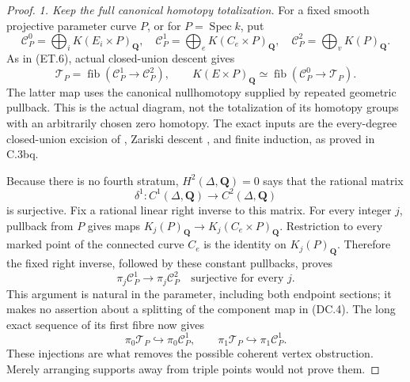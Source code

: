 \begin{proof}
\emph{1. Keep the full canonical homotopy totalization.}
For a fixed smooth projective parameter curve $P$, or for
$P=\operatorname{Spec}k$, put
\[
 \mathcal C_P^0=\bigoplus_iK(E_i\times P)_{\mathbf Q},\quad
 \mathcal C_P^1=\bigoplus_eK(C_e\times P)_{\mathbf Q},\quad
 \mathcal C_P^2=\bigoplus_vK(P)_{\mathbf Q}.
\]
As in (ET.6), actual closed-union descent gives
\begin{equation}
 \mathcal T_P=\operatorname{fib}(\mathcal C_P^1\to\mathcal C_P^2),
 \qquad
 K(E\times P)_{\mathbf Q}\simeq
                \operatorname{fib}(\mathcal C_P^0\to\mathcal T_P).
                                                               \tag{DC.4}
\end{equation}
The latter map uses the canonical nullhomotopy supplied by repeated
geometric pullback. This is the actual diagram, not the totalization
of its homotopy groups with an arbitrarily chosen zero homotopy.
The exact inputs are the every-degree closed-union excision of
\citet[Theorems A and C, printed pp.~29--30]
{rootGeisserHesselholt2011}, Zariski descent
\citep[Theorem 8.1 and proof, p.~367]{D_ThomasonTrobaugh1990},
and finite induction, as proved in C.3bq.

Because there is no fourth stratum, $H^2(\Delta,\mathbf Q)=0$ says
that the rational matrix
\[
             \delta^1:C^1(\Delta,\mathbf Q)
                              \longrightarrow C^2(\Delta,\mathbf Q)
\]
is surjective. Fix a rational linear right inverse to this matrix.
For every integer $j$, pullback from $P$ gives maps
$K_j(P)_{\mathbf Q}\to K_j(C_e\times P)_{\mathbf Q}$.
Restriction to every marked point of the connected curve $C_e$
is the identity on $K_j(P)_{\mathbf Q}$. Therefore the fixed right
inverse, followed by these constant pullbacks, proves
\begin{equation}
 \pi_j\mathcal C_P^1\longrightarrow\pi_j\mathcal C_P^2
          \quad\text{surjective for every }j.             \tag{DC.5}
\end{equation}
This argument is natural in the parameter, including both endpoint
sections; it makes no assertion about a splitting of the component
map in (DC.4). The long exact sequence of its first fibre now gives
\begin{equation}
 \pi_0\mathcal T_P\hookrightarrow\pi_0\mathcal C_P^1,
 \qquad
 \pi_1\mathcal T_P\hookrightarrow\pi_1\mathcal C_P^1.    \tag{DC.6}
\end{equation}
These injections are what removes the possible coherent vertex
obstruction. Merely arranging supports away from triple points
would not prove them.


\end{proof}
